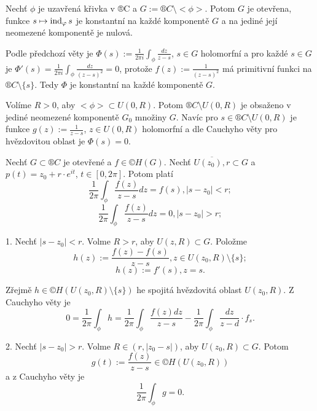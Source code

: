 \documentclass[12pt]{article}					%
\begin{document}
\begin{veta}
	Nechť $\phi$ je uzavřená křivka v ®C a $G := ®C \setminus <\phi>$. Potom $G$ je otevřena, funkce $s \mapsto \operatorname{ind}_\varphi s$ je konstantní na každé komponentě $G$ a na jediné její neomezené komponentě je nulová.

	\begin{dukazin}
		Podle předchozí věty je $\Phi(s) := \frac{1}{2 \pi i} \int_\phi \frac{dz}{z - s}$, $s \in G$ holomorfní a pro každé $s \in G$ je $\Phi'(s) = \frac{1}{2\pi i} \int_\phi \frac{dz}{(z - s)^2} = 0$, protože $f(z) := \frac{1}{(z - s)^2}$ má primitivní funkci na $®C \setminus \{s\}$. Tedy $\Phi$ je konstantní na každé komponentě $G$.

		Volíme $R > 0$, aby $<\phi> \subset U(0, R)$. Potom $®C \setminus U(0, R)$ je obsaženo v jediné neomezené komponentě $G_0$ množiny $G$. Navíc pro $s \in ®C \setminus U(0, R)$ je funkce $g(z) := \frac{1}{z - s}$, $z \in U(0, R)$ holomorfní a dle Cauchyho věty pro hvězdovitou oblast je $\Phi(s) = 0$.
	\end{dukazin}
\end{veta}


\begin{veta}
	Nechť $G \subset ®C$ je otevřené a $f \in ©H(G)$. Nechť $\overline{U(z_0), r} \subset G$ a $p(t) = z_0 + r·e^{it}$, $t \in [0, 2\pi]$. Potom platí
	$$ \frac{1}{2\pi} \int_\phi \frac{f(z)}{z - s} dz = f(s), |s - z_0| < r; $$
	$$ \frac{1}{2\pi} \int_\phi \frac{f(z)}{z - s} dz = 0, |s - z_0| > r; $$

	\begin{dukazin}
		1. Nechť $|s - z_0|<r$. Volme $R > r$, aby $U(z, R) \subset G$. Položme
		$$ h(z) := \frac{f(z) - f(s)}{z - s}, z \in U(z_0, R) \setminus \{s\}; $$
		$$ h(z) := f'(s), z = s. $$
		
		Zřejmě $h \in ©H(U(z_0, R) \setminus \{s\})$ he spojitá hvězdovitá oblast $U(z_0, R)$. Z Cauchyho věty je
		$$ 0 = \frac{1}{2\pi} \int_\phi h = \frac{1}{2\pi} \int_\phi \frac{f(z) dz}{z - s} - \frac{1}{2\pi} \int_\phi \frac{dz}{z - d}·f_s. $$

		2. Nechť $|s - z_0| > r$. Volme $R \in (r, |z_0 - s|)$, aby $U(z_0, R) \subset G$. Potom
		$$ g(t) := \frac{f(z)}{z - s} \in ©H(U(z_0, R)) $$
		a z Cauchyho věty je
		$$ \frac{1}{2\pi} \int_\phi g = 0. $$
	\end{dukazin}
\end{veta}
\end{document}
